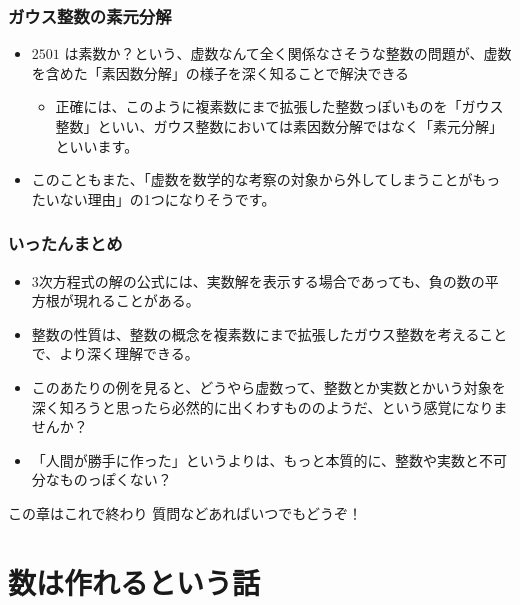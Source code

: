 \documentclass[dvipdfmx]{beamer}
\begin{document}
  \begin{frame}
    \frametitle{ガウス整数の素元分解}

    \begin{itemize}
      \item $2501$ は素数か？という、虚数なんて全く関係なさそうな整数の問題が、虚数を含めた「素因数分解」の様子を深く知ることで解決できる
      \begin{itemize}
        \item 正確には、このように複素数にまで拡張した整数っぽいものを「ガウス整数」といい、ガウス整数においては素因数分解ではなく「素元分解」といいます。
      \end{itemize}
      \item このこともまた、「虚数を数学的な考察の対象から外してしまうことがもったいない理由」の1つになりそうです。
    \end{itemize}

  \end{frame}

  \begin{frame}
    \frametitle{いったんまとめ}

    \begin{itemize}
      \item 3次方程式の解の公式には、実数解を表示する場合であっても、負の数の平方根が現れることがある。
      \item 整数の性質は、整数の概念を複素数にまで拡張したガウス整数を考えることで、より深く理解できる。

      \pause

      \item このあたりの例を見ると、どうやら虚数って、整数とか実数とかいう対象を深く知ろうと思ったら\alert{必然的に出くわす}もののようだ、という感覚になりませんか？
      \item 「人間が勝手に作った」というよりは、もっと本質的に、\alert{整数や実数と不可分}なものっぽくない？
    \end{itemize}

    \begin{block}{この章はこれで終わり}
      質問などあればいつでもどうぞ！
    \end{block}

  \end{frame}

  \section{数は作れるという話}
\end{document}
